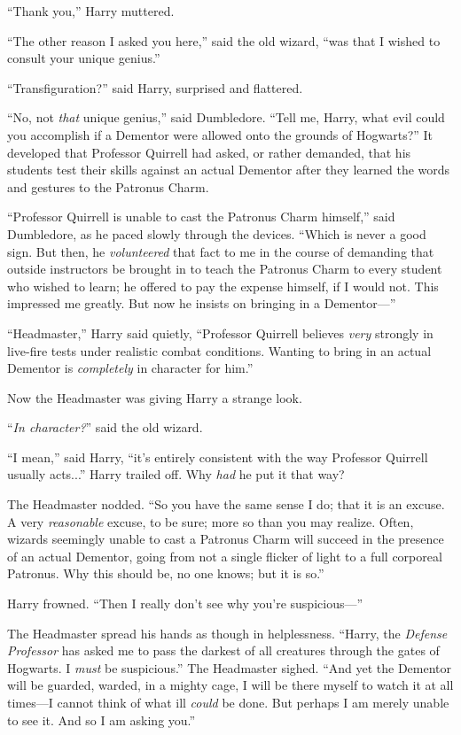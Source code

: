 “Thank you,” Harry muttered.

“The other reason I asked you here,” said the old wizard, “was that I wished to consult your unique genius.”

“Transfiguration?” said Harry, surprised and flattered.

“No, not \emph{that} unique genius,” said Dumbledore. “Tell me, Harry, what evil could you accomplish if a Dementor were allowed onto the grounds of Hogwarts?”
\sbreak
It developed that Professor Quirrell had asked, or rather demanded, that his students test their skills against an actual Dementor after they learned the words and gestures to the Patronus Charm.

“Professor Quirrell is unable to cast the Patronus Charm himself,” said Dumbledore, as he paced slowly through the devices. “Which is never a good sign. But then, he \emph{volunteered} that fact to me in the course of demanding that outside instructors be brought in to teach the Patronus Charm to every student who wished to learn; he offered to pay the expense himself, if I would not. This impressed me greatly. But now he insists on bringing in a Dementor—”

“Headmaster,” Harry said quietly, “Professor Quirrell believes \emph{very} strongly in live-fire tests under realistic combat conditions. Wanting to bring in an actual Dementor is \emph{completely} in character for him.”

Now the Headmaster was giving Harry a strange look.

“\emph{In character?}” said the old wizard.

“I mean,” said Harry, “it’s entirely consistent with the way Professor Quirrell usually acts...” Harry trailed off. Why \emph{had} he put it that way?

The Headmaster nodded. “So you have the same sense I do; that it is an excuse. A very \emph{reasonable} excuse, to be sure; more so than you may realize. Often, wizards seemingly unable to cast a Patronus Charm will succeed in the presence of an actual Dementor, going from not a single flicker of light to a full corporeal Patronus. Why this should be, no one knows; but it is so.”

Harry frowned. “Then I really don’t see why you’re suspicious—”

The Headmaster spread his hands as though in helplessness. “Harry, the \emph{Defense Professor} has asked me to pass the darkest of all creatures through the gates of Hogwarts. I \emph{must} be suspicious.” The Headmaster sighed. “And yet the Dementor will be guarded, warded, in a mighty cage, I will be there myself to watch it at all times—I cannot think of what ill \emph{could} be done. But perhaps I am merely unable to see it. And so I am asking you.”

